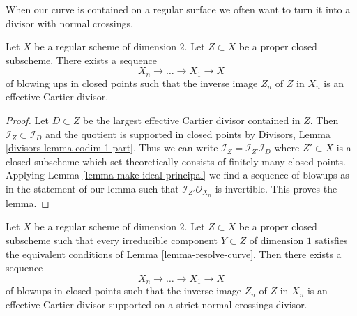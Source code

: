 \noindent
When our curve is contained on a regular surface we often want to
turn it into a divisor with normal crossings.

\begin{lemma}
\label{lemma-turn-into-effective-Cartier}
Let $X$ be a regular scheme of dimension $2$. Let $Z \subset X$
be a proper closed subscheme. There exists a sequence
$$
X_n \to \ldots \to X_1 \to X
$$
of blowing ups in closed points such that the inverse image $Z_n$ of $Z$
in $X_n$ is an effective Cartier divisor.
\end{lemma}

\begin{proof}
Let $D \subset Z$ be the largest effective Cartier divisor contained in $Z$.
Then $\mathcal{I}_Z \subset \mathcal{I}_D$ and the quotient is supported
in closed points by Divisors, Lemma \ref{divisors-lemma-codim-1-part}.
Thus we can write $\mathcal{I}_Z = \mathcal{I}_{Z'} \mathcal{I}_D$
where $Z' \subset X$ is a closed subscheme which set theoretically
consists of finitely many closed points. Applying
Lemma \ref{lemma-make-ideal-principal}
we find a sequence of blowups as in the statement of our lemma
such that $\mathcal{I}_{Z'}\mathcal{O}_{X_n}$ is invertible.
This proves the lemma.
\end{proof}

\begin{lemma}
\label{lemma-embedded-resolution}
Let $X$ be a regular scheme of dimension $2$. Let $Z \subset X$
be a proper closed subscheme such that every irreducible component
$Y \subset Z$ of dimension $1$ satisfies the equivalent conditions of
Lemma \ref{lemma-resolve-curve}. Then there exists a sequence
$$
X_n \to \ldots \to X_1 \to X
$$
of blowups in closed points such that the inverse image $Z_n$ of $Z$
in $X_n$ is an effective Cartier divisor supported on a strict normal crossings
divisor.
\end{lemma}

